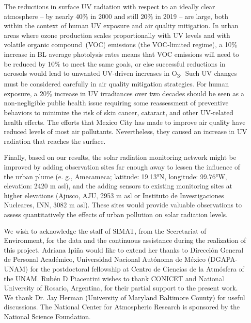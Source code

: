 \documentclass[journal=jacsat,manuscript=article]{achemso}
\begin{document}
The reductions in surface UV radiation with respect to an ideally clear
atmosphere -- by nearly 40\% in 2000 and still 20\% in 2019 -- are
large, both within the context of human UV exposure and air quality
mitigation. In urban areas where ozone production scales proportionally
with UV levels and with volatile organic compound~(VOC) emissions (the
VOC-limited regime), a 10\% increase in BL average photolysis rates
means that VOC emissions will need to be reduced by 10\% to meet the
same goals, or else successful reductions in aerosols would lead to
unwanted UV-driven increases in O\textsubscript{3}.~Such UV changes must
be considered carefully in air quality mitigation strategies. For human
exposure, a 20\% increase in UV irradiances over two decades should be
seen as a non-negligible public health issue requiring some reassessment
of preventive behaviors to minimize the risk of skin cancer, cataract,
and other UV-related health effects. The efforts that Mexico City has
made to improve air quality have reduced levels
of most air pollutants. Nevertheless, they caused an increase in UV
radiation that reaches the surface.

Finally, based on our results, the solar radiation monitoring network might
be improved by adding observation sites far enough away to lessen the
influence of the urban plume (e. g., Amecameca; latitude: 19.13°N, longitude: 99.76°W, elevation: 2420 m asl),
and the adding sensors to existing monitoring sites at higher elevations
(Ajusco, AJU, 2953 m asl or Instituto de Investigaciones Nucleares, INN, 3082 m asl).
These sites would provide valuable observations to assess quantitatively the effects of urban pollution on solar radiation levels.


\begin{acknowledgement}
  We wish to acknowledge the staff of SIMAT, from the Secretariat of
  Environment, for the data and the continuous assistance during the
  realization of this project. Adriana Ipiña would like to extend her
  thanks to Dirección General de Personal Académico, Universidad
  Nacional Autónoma de México (DGAPA-UNAM) for the postdoctoral fellowship
  at Centro de Ciencias de la Atmósfera of the UNAM. Rubén D Piacentini
  wishes to thank CONICET and National University of Rosario, Argentina,
  for their partial support to the present work. We thank Dr. Jay Herman
  (University of Maryland Baltimore County) for useful discussions. The National Center for
  Atmospheric Research is sponsored by the National Science Foundation.
\end{acknowledgement}
\end{document}
